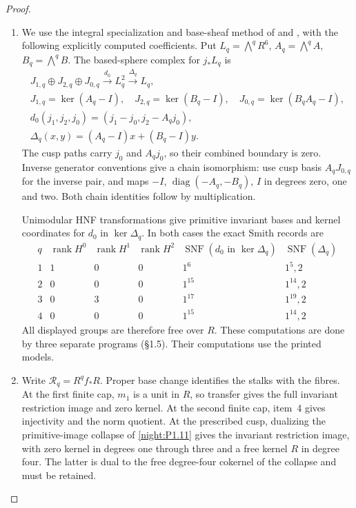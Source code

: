 \begin{proof}
\begin{enumerate}[label={$\langle1\rangle$\arabic*.}]
\[\]
\item We use the integral specialization and base-sheaf method
of \cite[Lemma~7.25 and Propositions~7.26--7.27, pp.~61--63]{AC26}
and \cite[section ``The integral homology'']{E26}, with the
following explicitly computed coefficients.  Put
$L_q=\bigwedge^qR^6$, $A_q=\bigwedge^qA$, $B_q=\bigwedge^qB$.
The based-sphere complex for $j_*L_q$ is
\[
\begin{gathered}
 J_{1,q}\oplus J_{2,q}\oplus J_{0,q}
 \xrightarrow{d_0} L_q^2\xrightarrow{\Delta_q}L_q,\\
 J_{1,q}=\ker(A_q-I),\quad J_{2,q}=\ker(B_q-I),\quad
 J_{0,q}=\ker(B_qA_q-I),\\
 d_0(j_1,j_2,j_0)=(j_1-j_0,j_2-A_qj_0),\\
 \Delta_q(x,y)=(A_q-I)x+(B_q-I)y.
\end{gathered}
\]
The cusp paths carry $j_0$ and $A_qj_0$, so their combined
boundary is zero.  Inverse generator conventions give a chain
isomorphism: use cusp basis $A_qJ_{0,q}$ for the inverse pair,
and maps $-I$, $\operatorname{diag}(-A_q,-B_q)$, $I$ in degrees
zero, one and two.  Both chain identities follow by multiplication.

Unimodular HNF transformations give primitive invariant bases
and kernel coordinates for $d_0$ in $\ker\Delta_q$.  In both cases
the exact Smith records are
\[
\begin{array}{c|ccc|c|c}
q&\operatorname{rank}H^0&\operatorname{rank}H^1&\operatorname{rank}H^2
 &\operatorname{SNF}(d_0\text{ in }\ker\Delta_q)
 &\operatorname{SNF}(\Delta_q)\\\hline
1&1&0&0&1^6&1^5,2\\
2&0&0&0&1^{15}&1^{14},2\\
3&0&3&0&1^{17}&1^{19},2\\
4&0&0&0&1^{15}&1^{14},2
\end{array}
\]
All displayed groups are therefore free over $R$.  These computations are done by three separate programs (\S1.5).  Their computations use the printed models.

\item Write $\mathcal R_q=R^qf_*R$.  Proper base change
\cite[Tag~09V5, Lemma~20.18.1]{StacksProject} identifies the stalks
with the fibres.  At the first finite cap, $m_1$ is a
unit in $R$, so transfer gives the full invariant restriction
image and zero kernel.  At the second finite cap, item~4 gives
injectivity and the norm quotient.  At the prescribed cusp,
dualizing the primitive-image collapse of
\cref{night:P1.11} gives the invariant restriction image, with
zero kernel in degrees one through three and a free kernel $R$
in degree four.  The latter is dual to the free degree-four
cokernel of the collapse and must be retained.


\end{enumerate}
\end{proof}
